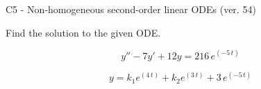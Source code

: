 \begin{exercise}
  \begin{exerciseTitle}C5 - Non-homogeneous second-order linear ODEs (ver. 54)\end{exerciseTitle}
  \begin{exerciseStatement}
    
Find the solution to the given ODE.

    
\[y''-7y'+12y = 216 \, e^{\left(-5 \, t\right)}\]

  \end{exerciseStatement}
  \begin{exerciseAnswer}
    
\[y= k_{1} e^{\left(4 \, t\right)} + k_{2} e^{\left(3 \, t\right)} + 3 \, e^{\left(-5 \, t\right)}\]

  \end{exerciseAnswer}
\end{exercise}